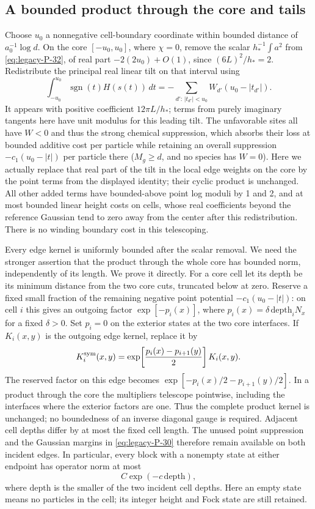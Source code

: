\subsection{A bounded product through the core and tails}
\label{u:core-product}

Choose \(u_0\) a nonnegative cell-boundary coordinate within bounded distance of \(a_0^{-1}\log d\). On the core \([-u_0,u_0]\), where \(\chi=0\), remove the scalar \(h_*^{-1}\int a^2\) from \eqref{eq:legacy-P-32}, of real part \(-2(2u_0)+O(1)\), since \((6L)^2/h_*=2\). Redistribute the principal real linear tilt on that interval using
\[
 \int_{-u_0}^{u_0}\operatorname{sgn}(t) H(s(t))\,dt
 =-\sum_{d':\, |t_{d'}|<u_0} W_{d'}(u_0-|t_{d'}|).
\]
It appears with positive coefficient \(12\pi L/h_*\); terms from purely imaginary tangents here have unit modulus for this leading tilt. The unfavorable sites all have \(W<0\) and thus the strong chemical suppression, which absorbs their loss at bounded additive cost per particle while retaining an overall suppression \(-c_1(u_0-|t|)\) per particle there (\(M_g\ge d\), and no species has \(W=0\)). Here we actually replace that real part of the tilt in the local edge weights on the core by the point terms from the displayed identity; their cyclic product is unchanged. All other added terms have bounded-above point log moduli by 1 and 2, and at most bounded linear height costs on cells, whose real coefficients beyond the reference Gaussian tend to zero away from the center after this redistribution. There is no winding boundary cost in this telescoping.



Every edge kernel is uniformly bounded after the scalar removal.
We need the stronger assertion that the product through the whole core
has bounded norm, independently of its length.  We prove it directly.
For a core cell let its depth be its minimum distance from the two core
cuts, truncated below at zero. Reserve a fixed small fraction of the
remaining negative point potential $-c_1(u_0-|t|)$: on cell $i$ this gives
an outgoing factor $\exp[-p_i(x)]$, where
$p_i(x)=\delta\,\mathrm{depth}_i N_x$ for a fixed $\delta>0$.
Set $p_i=0$ on the exterior states at the two core interfaces. If
$K_i(x,y)$ is the outgoing edge kernel, replace it by
\[
 K_i^{\rm sym}(x,y)
 =\exp\!\left[\frac{p_i(x)-p_{i+1}(y)}2\right]K_i(x,y).
\]
The reserved factor on this edge becomes
$\exp[-p_i(x)/2-p_{i+1}(y)/2]$. In a product through the core the
multipliers telescope pointwise, including the interfaces where the
exterior factors are one. Thus the complete product kernel is unchanged;
no boundedness of an inverse diagonal gauge is required. Adjacent cell
depths differ by at most the fixed cell length. The unused point
suppression and the Gaussian margins in \eqref{eq:legacy-P-30} therefore
remain available on both incident edges. In particular, every block
with a nonempty state at either endpoint has operator norm at most
\[
 C\exp(-c\,\mathrm{depth}),
\]
where $\mathrm{depth}$ is the smaller of the two incident cell depths.
Here an empty state means no particles in the cell; its integer height
and Fock state are still retained.

